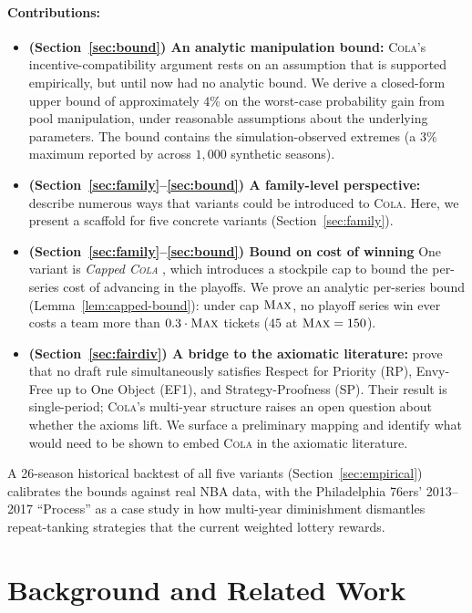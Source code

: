 \documentclass{article}
\newcommand{\cola}{\textup{\textsc{Cola}}}
\newcommand{\Max}{\textup{\textsc{Max}}}
\begin{document}
\paragraph{Contributions:}
\begin{itemize}
    \item \textbf{(Section~\ref{sec:bound}) An analytic manipulation bound:} \cola{}'s incentive-compatibility argument rests on an assumption that is supported empirically, but until now had no analytic bound. We derive a closed-form upper bound of approximately $4\%$ on the worst-case probability gain from pool manipulation, under reasonable assumptions about the underlying parameters. The bound contains the simulation-observed extremes (a $3\%$ maximum reported by \citet{highley2026cola} across $1{,}000$ synthetic seasons).
    \item \textbf{(Section~\ref{sec:family}--\ref{sec:bound}) A family-level perspective:} \citet{highley2026cola} describe numerous ways that variants could be introduced to \cola{}. Here, we present a scaffold for five concrete variants (Section~\ref{sec:family}).
    \item \textbf{(Section~\ref{sec:family}--\ref{sec:bound}) Bound on cost of winning} One variant is \emph{Capped \cola{}} \citep{highley2026solvable5}, which introduces a stockpile cap to bound the per-series cost of advancing in the playoffs. We prove an analytic per-series bound (Lemma~\ref{lem:capped-bound}): under cap $\Max$, no playoff series win ever costs a team more than $0.3 \cdot \Max$ tickets ($45$ at $\Max = 150$).
    \item \textbf{(Section~\ref{sec:fairdiv}) A bridge to the axiomatic literature:} \citet{coreno2022axiomatic} prove that no draft rule simultaneously satisfies Respect for Priority (RP), Envy-Free up to One Object (EF1), and Strategy-Proofness (SP). Their result is single-period; \cola{}'s multi-year structure raises an open question about whether the axioms lift. We surface a preliminary mapping and identify what would need to be shown to embed \cola{} in the axiomatic literature.
\end{itemize}

A 26-season historical backtest of all five variants (Section~\ref{sec:empirical}) calibrates the bounds against real NBA data, with the Philadelphia 76ers' 2013--2017 ``Process'' as a case study in how multi-year diminishment dismantles repeat-tanking strategies that the current weighted lottery rewards.

\section{Background and Related Work}
\label{sec:background}
\end{document}
